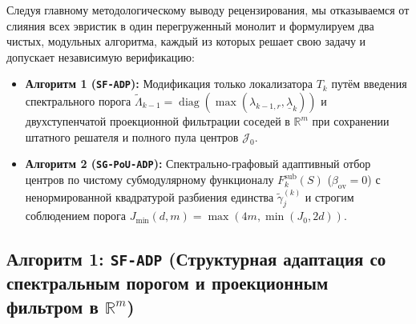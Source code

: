 \documentclass[11pt,a4paper]{article}
\newcommand{\R}{\mathbb{R}}
\newcommand{\TEDR}{T}
\newcommand{\JJJ}{\mathcal{J}}
\DeclareMathOperator{\diag}{diag}
\theoremstyle{definition}
\theoremstyle{remark}
\begin{document}
Следуя главному методологическому выводу рецензирования, мы отказываемся от слияния всех эвристик в один перегруженный монолит и формулируем два чистых, модульных алгоритма, каждый из которых решает свою задачу и допускает независимую верификацию:
\begin{itemize}
    \item \textbf{Алгоритм 1 (\texttt{SF-ADP}):} Модификация только локализатора $\TEDR_k$ путём введения спектрального порога $\widetilde{\Lambda}_{k-1} = \diag(\max(\lambda_{k-1,r}, \underline{\lambda}_k))$ и двухступенчатой проекционной фильтрации соседей в $\R^m$ при сохранении штатного решателя и полного пула центров $\JJJ_0$.
    \item \textbf{Алгоритм 2 (\texttt{SG-PoU-ADP}):} Спектрально-графовый адаптивный отбор центров по чистому субмодулярному функционалу $F_k^{\mathrm{sub}}(S)$ ($\beta_{\mathrm{ov}} = 0$) с ненормированной квадратурой разбиения единства $\tilde{\gamma}_j^{(k)}$ и строгим соблюдением порога $J_{\min}(d,m) = \max(4m, \min(J_0, 2d))$.
\end{itemize}

\subsection{Алгоритм 1: \texttt{SF-ADP} (Структурная адаптация со спектральным порогом и проекционным фильтром в $\R^m$)}
\end{document}
